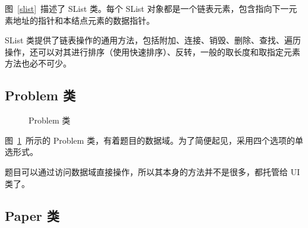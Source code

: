 图~\ref{slist}~描述了 SList 类。每个 SList 对象都是一个链表元素，包含指向下一元素地址的指针和本结点元素的数据指针。

SList 类提供了链表操作的通用方法，包括附加、连接、销毁、删除、查找、遍历操作，还可以对其进行排序（使用快速排序）、反转，一般的取长度和取指定元素方法也必不可少。

\subsection{Problem 类}

\begin{figure}[htp]
  \pictext\small
{}
  \caption{\label{problem}Problem 类}
\end{figure}

图~\ref{problem}~所示的 Problem 类，有着题目的数据域。为了简便起见，采用四个选项的单选形式。

题目可以通过访问数据域直接操作，所以其本身的方法并不是很多，都托管给 UI 类了。

\subsection{Paper 类}

